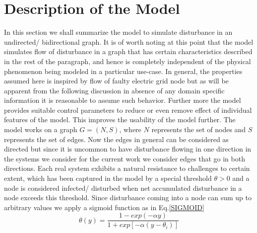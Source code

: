 \documentclass[11pt]{article}
\begin{document}
\section{Description of the Model}
In this section we shall summarize the model to simulate disturbance in an undirected/ bidirectional graph. It is of worth noting at this point that the model simulates flow of disturbance in a graph that has certain characteristics described in the rest of the paragraph, and hence is completely independent of the physical phenomenon being modeled in a particular use-case. In general, the properties assumed here is inspired by flow of faulty electric grid node but as will be apparent from the following discussion in absence of any domain specific information it is reasonable to assume such behavior. Further more the model provides suitable control parameters to reduce or even remove effect of individual features of the model. This improves the usability of the model further. The model works on a graph $G = (N, S)$, where $N$ represents the set of nodes and $S$ represents the set of edges. Now the edges in general can be considered as directed but since it is uncommon to have disturbance flowing in one direction in the systems we consider for the current work we consider edges that go in both directions. Each real system exhibits a natural resistance to challenges to certain extent, which has been captured in the model by a special threshold $\theta > 0$ and a node is considered infected/ disturbed when net accumulated disturbance in a node exceeds this threshold. Since disturbance coming into a node can sum up to arbitrary values we apply a sigmoid function as in Eq.\ref{SIGMOID}
\begin{equation}
\theta(y) = \frac{1-exp(-\alpha y)}{1+exp[-\alpha(y-\theta_i)]} 
\label{SIGMOID}
\end{equation}
\end{document}
